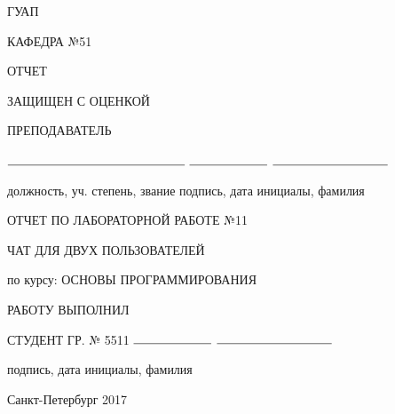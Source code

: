 \documentclass{article}
\begin{document}
\begin{titlepage}
	\begin{center}
    	ГУАП
    	\vspace{0.25cm}

    	КАФЕДРА №51
	\end{center}

    \begin{flushleft}

    	ОТЧЕТ

    	ЗАЩИЩЕН С ОЦЕНКОЙ

		ПРЕПОДАВАТЕЛЬ 


    	\vspace{0.5cm} 

		$\rule{5cm}{0.15mm}$ \hfill $\rule{2.2cm}{0.15mm}$  \hfill $\rule{3.25cm}{0.15mm}$

		должность, уч. степень, звание \hfill подпись, дата \hfill инициалы, фамилия
    \end{flushleft}
    
 	
    \hspace{2cm}

	\begin{center}
    	ОТЧЕТ ПО ЛАБОРАТОРНОЙ РАБОТЕ №11


    	\vspace{1cm}

    	ЧАТ ДЛЯ ДВУХ ПОЛЬЗОВАТЕЛЕЙ


    	\vspace{1cm}

    	по курсу: ОСНОВЫ ПРОГРАММИРОВАНИЯ {\MakeUppercase{}}
    \end{center}

    \vspace{3cm}

    \begin{flushleft}
    	РАБОТУ ВЫПОЛНИЛ

    	СТУДЕНТ ГР. № 5511 \hfill $\rule{2.2cm}{0.15mm}$  \hfill $\rule{3.25cm}{0.15mm}$

    	\hspace{7.8cm} подпись, дата \hfill инициалы, фамилия
    \end{flushleft}

	\vspace{5cm}   
	\begin{center}
 		Санкт-Петербург 2017
	\end{center}
\end{titlepage}
\end{document}
